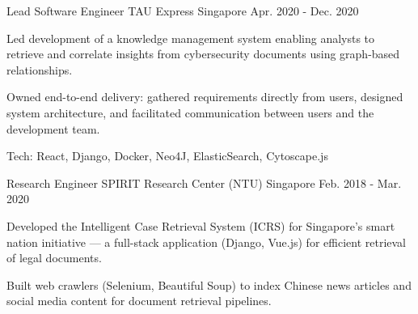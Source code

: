 \begin{cventries}
  \cventry
    {Lead Software Engineer} %
    {TAU Express} %
    {Singapore} %
    {Apr. 2020 - Dec. 2020} %
    {
      \begin{cvitems} %
        \item {Led development of a knowledge management system enabling analysts to retrieve and correlate insights from cybersecurity documents using graph-based relationships.}
        \item {Owned end-to-end delivery: gathered requirements directly from users, designed system architecture, and facilitated communication between users and the development team.}
        \item {Tech: React, Django, Docker, Neo4J, ElasticSearch, Cytoscape.js}
      \end{cvitems}
    }

  \cventry
    {Research Engineer} %
    {SPIRIT Research Center (NTU)} %
    {Singapore} %
    {Feb. 2018 - Mar. 2020} %
    {
      \begin{cvitems} %
        \item {Developed the Intelligent Case Retrieval System (ICRS) for Singapore's smart nation initiative --- a full-stack application (Django, Vue.js) for efficient retrieval of legal documents.}
        \item {Built web crawlers (Selenium, Beautiful Soup) to index Chinese news articles and social media content for document retrieval pipelines.}
      \end{cvitems}
    }

\end{cventries}
